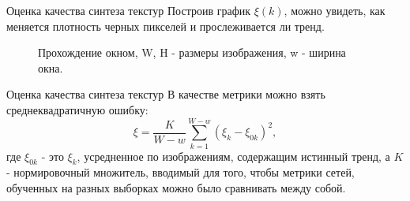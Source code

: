 \documentclass[12pt]{beamer}
\begin{document}
	\begin{frame}{Оценка качества синтеза текстур}
		Построив график $\xi(k)$, можно увидеть, как меняется плотность черных пикселей и прослеживается ли тренд.
		
		\begin{figure}[h!]
			\caption{Прохождение окном, W, H - размеры изображения, w - ширина окна.}
			\label{7-window}
		\end{figure}
	\end{frame}
	
	\begin{frame}{Оценка качества синтеза текстур}
		В качестве метрики можно взять среднеквадратичную ошибку:
		$$ \xi = \frac{K}{W-w}\sum_{k=1}^{W-w} (\xi_k - \xi_{0k})^2,$$
		где $\xi_{0k}$ - это $\xi_k$, усредненное по изображениям, содержащим истинный тренд, а $K$ - нормировочный множитель, вводимый для того, чтобы метрики сетей, обученных на разных выборках можно было сравнивать между собой.
	\end{frame}
	
\end{document}
